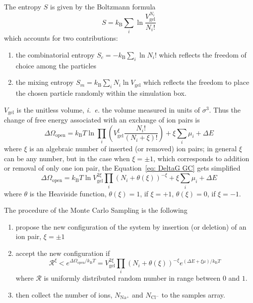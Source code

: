 \documentclass[journal,article,submit,pdftex,moreauthors]{Definitions/mdpi}
\newcommand{\ie}{\textit{i.~e.} }
\newcommand{\kT}{k_\mathrm{B}T}
\newcommand{\kB}{k_\mathrm{B}}
\newcommand{\Nna}{N_\mathrm{Na^+}}
\newcommand{\Ncl}{N_\mathrm{Cl^-}}
\newcommand{\Vgel}{V_\mathrm{gel}}
\newcommand{\refeq}[1]{Equation~\ref{#1}{}}
\begin{document}
The entropy $S$ is given by the Boltzmann formula~\cite{Nagle2004}
\begin{equation}
    S=\kB\sum_i\ln\frac{\Vgel^{N_i}}{N_i!}\label{eq:entropy}
\end{equation}
which accounts for two contributions:
\begin{enumerate}
    \item the combinatorial entropy $S_{c}=-\kB\sum_i\ln N_i!$ which reflects the freedom of choice among the particles
    \item the mixing entropy $S_{m}=\kB \sum_i N_i\ln \Vgel$ which reflects the freedom to place the chosen particle randomly within the simulation box. 
\end{enumerate}
$\Vgel$ is the unitless volume, \ie the volume measured in units of $\sigma^3$. 
Thus the change of free energy associated with an exchange of ion pairs is
\begin{equation}
\Delta\Omega_\mathrm{open}=\kT\ln\prod_i\left(\Vgel^{\xi}\frac{N_i!}{\left(N_i+\xi\right)!}\right)+\xi\sum_i\mu_i+\Delta E
\label{eq: DeltaG GC}
\end{equation}
where $\xi$ is an algebraic number of inserted (or removed) ion pairs; in general $\xi$ can be any number, but in the case when $\xi = \pm 1$, which corresponds to addition or removal of only one ion pair, the \refeq{eq: DeltaG GC} gets simplified
\begin{equation}
    \Delta\Omega_\mathrm{open}=\kT\ln \Vgel^{2\xi} \prod_i \left(N_i+\theta(\xi)\right)^{-\xi}+\xi\sum_i\mu_i+\Delta E
\label{eq: DeltaG GC_simpl}
\end{equation}
where $\theta$ is the Heaviside function, $\theta(\xi) = 1$, if $\xi=+1$, $\theta(\xi) = 0$, if $\xi=-1$.

The procedure of the Monte Carlo Sampling is the following \cite{Frenlkel2002_book}
\begin{enumerate}
	\item propose the new configuration of the system by insertion (or deletion) of an ion pair, $\xi=\pm1$
	\item accept the new configuration if
	\begin{equation}
        \mathcal{R}^{\xi}<e^{\Delta\Omega_\mathrm{open}/\kT}=\Vgel^{2\xi} \prod_i \left(N_i+\theta(\xi)\right)^{-\xi}e^{\left(\Delta E+\xi\mu\right)/\kT}\label{eq: GC acceptance}
	\end{equation}
	where $\mathcal{R}$ is uniformly distributed random number in range between $0$ and $1$.
	\item then collect the number of ions, $\Nna$ and $\Ncl$ to the samples array.
\end{enumerate}
\end{document}
